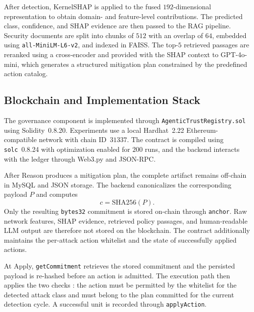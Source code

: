 \documentclass[10pt, conference]{IEEEtran}
\begin{document}
After detection, KernelSHAP is applied to the fused $192$-dimensional representation to obtain domain- and feature-level contributions. The predicted class, confidence, and SHAP evidence are then passed to the RAG pipeline. Security documents are split into chunks of $512$ with an overlap of $64$, embedded using \texttt{all-MiniLM-L6-v2}, and indexed in FAISS. The top-$5$ retrieved passages are reranked using a cross-encoder and provided with the SHAP context to GPT-4o-mini, which generates a structured mitigation plan constrained by the predefined action catalog.

\subsection{Blockchain and Implementation Stack}

The governance component is implemented through
\texttt{AgenticTrustRegistry.sol} using Solidity~0.8.20. Experiments use a local Hardhat~2.22 Ethereum-compatible network with chain ID~$31337$. The contract is compiled using \texttt{solc}~0.8.24 with optimization enabled for $200$ runs, and the backend interacts with the ledger through Web3.py and JSON-RPC.

After Reason produces a mitigation plan, the complete artifact remains off-chain in MySQL and JSON storage. The backend canonicalizes the corresponding payload $P$ and computes
\[
c=\mathrm{SHA256}(P).
\]
Only the resulting \texttt{bytes32} commitment is stored on-chain through \texttt{anchor}. Raw network features, SHAP evidence, retrieved policy passages, and human-readable LLM output are therefore not stored on the blockchain. The contract additionally maintains the per-attack action whitelist and the state of successfully applied actions.

At Apply, \texttt{getCommitment} retrieves the stored commitment and the persisted payload is re-hashed before an action is admitted. The execution path then applies the two checks : the action must be permitted by the whitelist for the detected attack class and must belong to the plan committed for the current detection cycle. A successful unit is recorded through \texttt{applyAction}.
\end{document}
